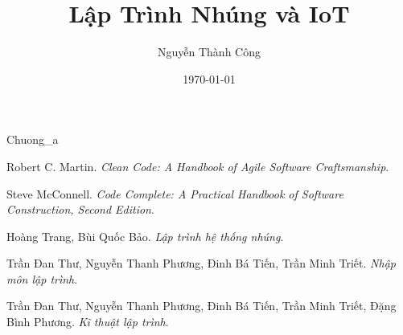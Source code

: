 \documentclass[12pt,a5paper]{book}
\title{Lập Trình Nhúng và IoT}
\date{\today}
\author{Nguyễn Thành Công}
\begin{document}
\maketitle






{Chuong_a}

\begin{thebibliography}{9}
Robert C. Martin. 
\textit{Clean Code: A Handbook of Agile Software Craftsmanship}. 
 
Steve McConnell.
\textit{Code Complete: A Practical Handbook of Software Construction, Second Edition}.

Hoàng Trang, Bùi Quốc Bảo.
\textit{Lập trình hệ thống nhúng}.

Trần Đan Thư, Nguyễn Thanh Phương, Đinh Bá Tiến, Trần Minh Triết.
\textit{Nhập môn lập trình}.

Trần Đan Thư, Nguyễn Thanh Phương, Đinh Bá Tiến, Trần Minh Triết, Đặng Bình Phương.
\textit{Kĩ thuật lập trình}.

\end{thebibliography}
\end{document}
